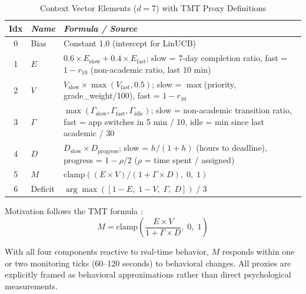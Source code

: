 \documentclass[conference]{IEEEtran}
\begin{document}
\begin{table}[htbp]
\caption{Context Vector Elements ($d = 7$) with TMT Proxy Definitions}
\label{tab_context_vector}
\begin{center}
\footnotesize
\begin{tabular}{|c|p{1.2cm}|p{5.0cm}|}
\hline
\textbf{Idx} & \textbf{\textit{Name}} & \textbf{\textit{Formula / Source}} \\
\hline
0 & Bias & Constant 1.0 (intercept for LinUCB) \\
\hline
1 & $E$ & $0.6 \times E_{\text{slow}} + 0.4 \times E_{\text{fast}}$; slow = 7-day completion ratio, fast = $1 - r_{10}$ (non-academic ratio, last 10 min) \\
\hline
2 & $V$ & $V_{\text{slow}} \times \max(V_{\text{fast}}, 0.5)$; slow = $\max$(priority, grade\_weight/100), fast = $1 - r_{10}$ \\
\hline
3 & $\Gamma$ & $\max(\Gamma_{\text{slow}}, \Gamma_{\text{fast}}, \Gamma_{\text{idle}})$; slow = non-academic transition ratio, fast = app switches in 5 min / 10, idle = min since last academic / 30 \\
\hline
4 & $D$ & $D_{\text{slow}} \times D_{\text{progress}}$; slow = $h/(1+h)$ (hours to deadline), progress = $1 - \rho/2$ ($\rho$ = time spent / assigned) \\
\hline
5 & $M$ & $\text{clamp}((E \times V) / (1 + \Gamma \times D),\; 0,\; 1)$ \\
\hline
6 & Deficit & $\arg\max([1{-}E,\; 1{-}V,\; \Gamma,\; D]) \;/\; 3$ \\
\hline
\end{tabular}
\end{center}
\end{table}

Motivation follows the TMT formula \cite{b8}:
\begin{equation}
M = \text{clamp}\!\left(\frac{E \times V}{1 + \Gamma \times D},\; 0,\; 1\right)
\label{eq_tmt}
\end{equation}

With all four components reactive to real-time behavior, $M$ responds within one or two monitoring ticks (60--120 seconds) to behavioral changes. All proxies are explicitly framed as behavioral approximations rather than direct psychological measurements.
\end{document}
